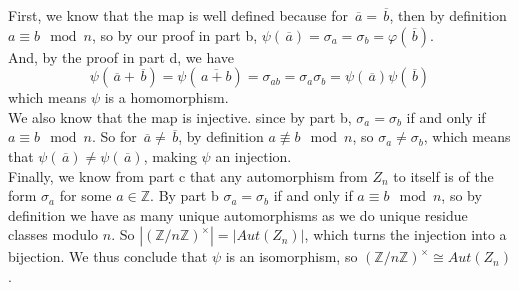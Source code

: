 \documentclass{article}
\newcommand{\Z}{\mathbb{Z}}
\newcommand{\olsi}[1]{\,\overline{\!{#1}}}
\begin{document}
\begin{enumerate}[label=\textbf{\alph*.}]
            First, we know that the map is well defined
            because for $\olsi{a} = \olsi{b}$,
            then by definition $a \equiv b \mod n$,
            so by our proof in part b,
            $\psi(\olsi{a}) = \sigma_a = \sigma_b = \varphi(\olsi{b})$. \\
            And, by the proof in part d, we have
            \[ \psi(\olsi{a} + \olsi{b})
            = \psi(\olsi{a + b})
            = \sigma_{ab}
            = \sigma_{a}\sigma_{b} 
            = \psi(\olsi{a})\psi(\olsi{b}) \]
            which means $\psi$ is a homomorphism. \\
            We also know that the map is injective.
            since by part b, $\sigma_a = \sigma_b$
            if and only if $a \equiv b \mod n$.
            So for $\olsi{a} \neq \olsi{b}$,
            by definition $a \not\equiv b \mod n$,
            so $\sigma_a \neq \sigma_b$,
            which means that $\psi(\olsi{a}) \neq \psi(\olsi{a})$,
            making $\psi$ an injection. \\
            Finally, we know from part c that any automorphism
            from $Z_n$ to itself is of the form $\sigma_a$
            for some $a \in \Z$.
            By part b $\sigma_a = \sigma_b$
            if and only if $a \equiv b \mod n$,
            so by definition we have as many
            unique automorphisms as we do unique residue classes
            modulo $n$.
            So $|(\Z/n\Z)^\times| = |Aut(Z_n)|$,
            which turns the injection into a bijection.
            We thus conclude that $\psi$ is an isomorphism,
            so $(\Z/n\Z)^\times \cong Aut(Z_n)$.
    \end{enumerate}
\end{document}
